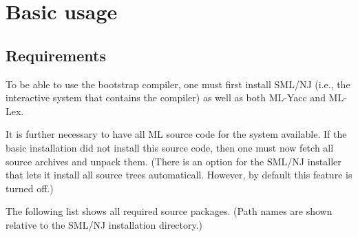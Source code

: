 
\section{Basic usage}

\subsection{Requirements}

To be able to use the bootstrap compiler, one must first install
SML/NJ (i.e., the interactive system that contains the compiler) as
well as both ML-Yacc and ML-Lex.

It is further necessary to have all ML source code for the system
available.  If the basic installation did not install this source
code, then one must now fetch all source archives and unpack them.
(There is an option for the SML/NJ installer that lets it install all
source trees automaticall.  However, by default this feature is turned
off.)

The following list shows all required source packages.  (Path names
are shown relative to the SML/NJ installation directory.)

